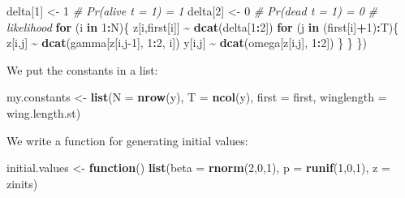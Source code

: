 \documentclass[
  12pt,
]{krantz}
\newenvironment{Shaded}{\begin{snugshade}}{\end{snugshade}}
\newcommand{\AttributeTok}[1]{\textcolor[rgb]{0.13,0.29,0.53}{#1}}
\newcommand{\CommentTok}[1]{\textcolor[rgb]{0.56,0.35,0.01}{\textit{#1}}}
\newcommand{\ControlFlowTok}[1]{\textcolor[rgb]{0.13,0.29,0.53}{\textbf{#1}}}
\newcommand{\DecValTok}[1]{\textcolor[rgb]{0.00,0.00,0.81}{#1}}
\newcommand{\FunctionTok}[1]{\textcolor[rgb]{0.13,0.29,0.53}{\textbf{#1}}}
\newcommand{\NormalTok}[1]{#1}
\newcommand{\OtherTok}[1]{\textcolor[rgb]{0.56,0.35,0.01}{#1}}
\newcommand{\SpecialCharTok}[1]{\textcolor[rgb]{0.81,0.36,0.00}{\textbf{#1}}}
\begin{document}
\begin{Shaded}
\begin{Highlighting}[]
\NormalTok{  delta[}\DecValTok{1}\NormalTok{] }\OtherTok{\textless{}{-}} \DecValTok{1}                 \CommentTok{\# Pr(alive t = 1) = 1}
\NormalTok{  delta[}\DecValTok{2}\NormalTok{] }\OtherTok{\textless{}{-}} \DecValTok{0}                 \CommentTok{\# Pr(dead t = 1) = 0}
  \CommentTok{\# likelihood}
  \ControlFlowTok{for}\NormalTok{ (i }\ControlFlowTok{in} \DecValTok{1}\SpecialCharTok{:}\NormalTok{N)\{}
\NormalTok{    z[i,first[i]] }\SpecialCharTok{\textasciitilde{}} \FunctionTok{dcat}\NormalTok{(delta[}\DecValTok{1}\SpecialCharTok{:}\DecValTok{2}\NormalTok{])}
    \ControlFlowTok{for}\NormalTok{ (j }\ControlFlowTok{in}\NormalTok{ (first[i]}\SpecialCharTok{+}\DecValTok{1}\NormalTok{)}\SpecialCharTok{:}\NormalTok{T)\{}
\NormalTok{      z[i,j] }\SpecialCharTok{\textasciitilde{}} \FunctionTok{dcat}\NormalTok{(gamma[z[i,j}\DecValTok{{-}1}\NormalTok{], }\DecValTok{1}\SpecialCharTok{:}\DecValTok{2}\NormalTok{, i])}
\NormalTok{      y[i,j] }\SpecialCharTok{\textasciitilde{}} \FunctionTok{dcat}\NormalTok{(omega[z[i,j], }\DecValTok{1}\SpecialCharTok{:}\DecValTok{2}\NormalTok{])}
\NormalTok{    \}}
\NormalTok{  \}}
\NormalTok{\})}
\end{Highlighting}
\end{Shaded}

We put the constants in a list:

\begin{Shaded}
\begin{Highlighting}[]
\NormalTok{my.constants }\OtherTok{\textless{}{-}} \FunctionTok{list}\NormalTok{(}\AttributeTok{N =} \FunctionTok{nrow}\NormalTok{(y), }
                     \AttributeTok{T =} \FunctionTok{ncol}\NormalTok{(y), }
                     \AttributeTok{first =}\NormalTok{ first,}
                     \AttributeTok{winglength =}\NormalTok{ wing.length.st)}
\end{Highlighting}
\end{Shaded}

We write a function for generating initial values:

\begin{Shaded}
\begin{Highlighting}[]
\NormalTok{initial.values }\OtherTok{\textless{}{-}} \ControlFlowTok{function}\NormalTok{() }\FunctionTok{list}\NormalTok{(}\AttributeTok{beta =} \FunctionTok{rnorm}\NormalTok{(}\DecValTok{2}\NormalTok{,}\DecValTok{0}\NormalTok{,}\DecValTok{1}\NormalTok{),}
                                  \AttributeTok{p =} \FunctionTok{runif}\NormalTok{(}\DecValTok{1}\NormalTok{,}\DecValTok{0}\NormalTok{,}\DecValTok{1}\NormalTok{),}
                                  \AttributeTok{z =}\NormalTok{ zinits)}
\end{Highlighting}
\end{Shaded}
\end{document}
